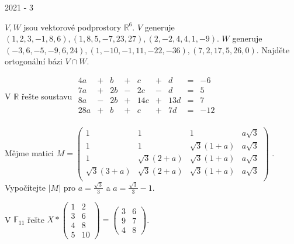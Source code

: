 
\newpage
{\large 2021 - 3}

\begin{questions}

\question \(V, W\) jsou vektorové podprostory \(\mathbb{R}^6\). \(V\) generuje \((1,2,3,-1,8,6),(1,8,5,-7,23,27),(2,-2,4,4,1,-9)\). \(W\) generuje \((-3,6,-5,-9,6,24),(1,-10,-1,11,-22,-36),(7,2,17,5,26,0)\). Najděte ortogonální bázi \(V \cap W\).

\question V \(\mathbb{R}\) řešte soustavu \(\begin{matrix}
     4a & + &  b & + &   c & + &   d & = & -6\\
     7a & + & 2b & - &  2c & - &   d & = & 5\\
     8a & - & 2b & + & 14c & + & 13d & = & 7\\
    28a & + &  b & + &   c & + &  7d & = & -12\\
\end{matrix}\)

\newpage
\question Mějme matici \(M = \begin{pmatrix}
                1 &             1 &             1 & a\sqrt{3} \\
                1 &             1 & \sqrt{3}(1+a) & a\sqrt{3} \\
                1 & \sqrt{3}(2+a) & \sqrt{3}(1+a) & a\sqrt{3} \\
    \sqrt{3}(3+a) & \sqrt{3}(2+a) & \sqrt{3}(1+a) & a\sqrt{3} \\
\end{pmatrix}\)
. Vypočítejte \(|M|\) pro \(a=\frac{\sqrt{3}}{3}\) a \(a = \frac{\sqrt{3}}{3}-1\).

\question V \(\mathbb{F}_{11}\) řešte \(X * \begin{pmatrix}
    1 & 2\\
    3 & 6\\
    4 & 8\\
    5 & 10
\end{pmatrix} = \begin{pmatrix}
    3 & 6\\
    9 & 7\\
    4 & 8
\end{pmatrix}\).


\end{questions}
